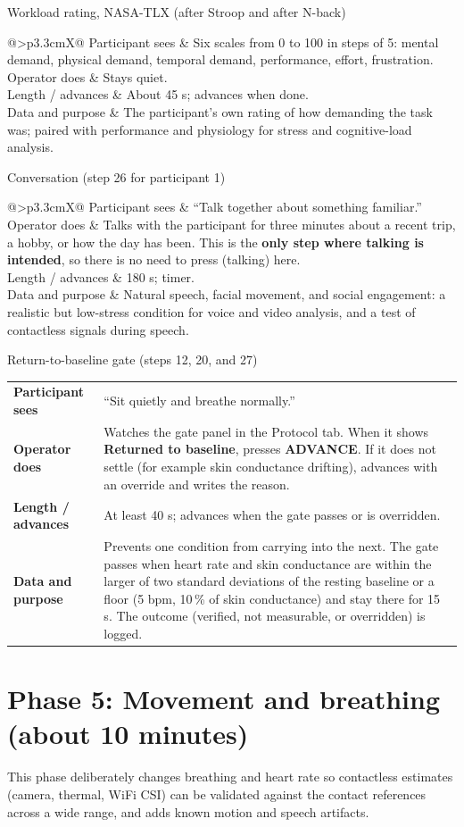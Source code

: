 \documentclass[11pt,a4paper]{article}
\makeatletter
\newcommand{\ui}[1]{\textsf{\textbf{#1}}}
\newcommand{\key}[1]{\fbox{\texttt{#1}}}
\newcommand{\stepdetail}[4]{%
  \begin{tabularx}{\linewidth}{@{}>{\bfseries}p{3.3cm}X@{}}
    Participant sees & #1 \\
    Operator does & #2 \\
    Length / advances & #3 \\
    Data and purpose & #4 \\
  \end{tabularx}}
\makeatother
\begin{document}
\begin{stepbox}{Workload rating, NASA-TLX (after Stroop and after N-back)}
\stepdetail{Six scales from 0 to 100 in steps of 5: mental demand, physical demand, temporal demand, performance,
effort, frustration.}
{Stays quiet.}
{About 45 s; advances when done.}
{The participant's own rating of how demanding the task was; paired with performance and physiology for stress
and cognitive-load analysis.}
\end{stepbox}

\begin{stepbox}{Conversation (step 26 for participant 1)}
\stepdetail{``Talk together about something familiar.''}
{Talks with the participant for three minutes about a recent trip, a hobby, or how the day has been. This is the
\textbf{only step where talking is intended}, so there is no need to press \key{T} (talking) here.}
{180 s; timer.}
{Natural speech, facial movement, and social engagement: a realistic but low-stress condition for voice and video
analysis, and a test of contactless signals during speech.}
\end{stepbox}

\begin{stepbox}{Return-to-baseline gate (steps 12, 20, and 27)}
\stepdetail{``Sit quietly and breathe normally.''}
{Watches the gate panel in the Protocol tab. When it shows \ui{Returned to baseline}, presses \ui{ADVANCE}. If it
does not settle (for example skin conductance drifting), advances with an override and writes the reason.}
{At least 40 s; advances when the gate passes or is overridden.}
{Prevents one condition from carrying into the next. The gate passes when heart rate and skin conductance are within
the larger of two standard deviations of the resting baseline or a floor (5 bpm, 10\,\% of skin conductance) and
stay there for 15 s. The outcome (verified, not measurable, or overridden) is logged.}
\end{stepbox}

\section{Phase 5: Movement and breathing (about 10 minutes)}

This phase deliberately changes breathing and heart rate so contactless estimates (camera, thermal, WiFi CSI) can be
validated against the contact references across a wide range, and adds known motion and speech artifacts.
\end{document}
